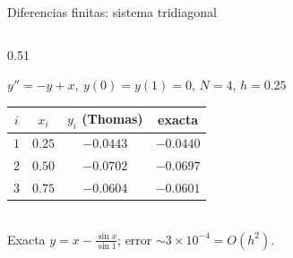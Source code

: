 \documentclass[aspectratio=169,10pt]{beamer}
\begin{document}
\begin{frame}{Diferencias finitas: sistema tridiagonal}
\begin{columns}[T]
\begin{column}{0.51\textwidth}
\begin{cardgear}{$y''=-y+x,\ y(0)=y(1)=0$, $N=4$, $h=0.25$}{\faCalculator}
\centering
{\footnotesize\renewcommand{\arraystretch}{1.25}\setlength{\tabcolsep}{6pt}
\begin{tabular}{c|c|c|c}
$i$ & $x_i$ & $y_i$ (Thomas) & exacta\\\hline
$1$ & $0.25$ & $-0.0443$ & $-0.0440$\\
$2$ & $0.50$ & $-0.0702$ & $-0.0697$\\
$3$ & $0.75$ & $-0.0604$ & $-0.0601$\\
\end{tabular}}\\[1.0mm]
{\footnotesize Exacta $y=x-\tfrac{\sin x}{\sin1}$; error $\sim3{\times}10^{-4}=O(h^2)$.}
\end{cardgear}
\end{column}
\end{columns}
\end{frame}
\end{document}
